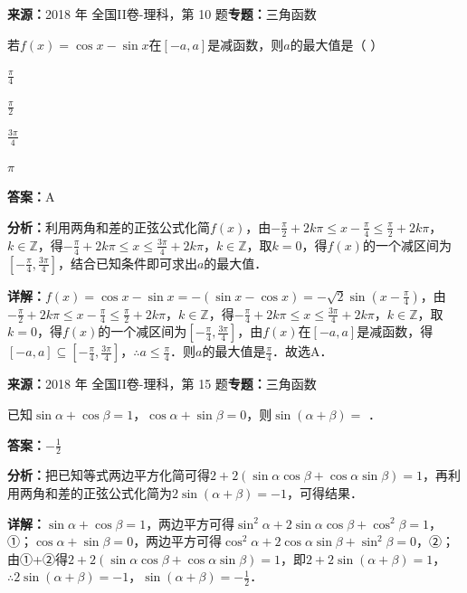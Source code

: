 \begin{question}[points=5]
\textbf{来源：}2018 年 全国II卷-理科，第 10 题\quad \textbf{专题：}三角函数\par
若$f(x)=\cos x-\sin x$在$[-a,a]$是减函数，则$a$的最大值是（                                                 ）
\begin{choices}
  \item $\frac{\pi}{4}$
  \item $\frac{\pi}{2}$
  \item $\frac{3\pi}{4}$
  \item $\pi$
\end{choices}
\begin{solution}
\textbf{答案：}A

\textbf{分析：}利用两角和差的正弦公式化简$f(x)$，由$-\frac{\pi}{2}+2k\pi\le x-\frac{\pi}{4}\le \frac{\pi}{2}+2k\pi$，$k\in\mathbb{Z}$，得$-\frac{\pi}{4}+2k\pi\le x\le \frac{3\pi}{4}+2k\pi$，$k\in\mathbb{Z}$，取$k=0$，得$f(x)$的一个减区间为$[-\frac{\pi}{4},\frac{3\pi}{4}]$，结合已知条件即可求出$a$的最大值．

\textbf{详解：}$f(x)=\cos x-\sin x=-(\sin x-\cos x)=-\sqrt{2}\sin(x-\frac{\pi}{4})$，由$-\frac{\pi}{2}+2k\pi\le x-\frac{\pi}{4}\le \frac{\pi}{2}+2k\pi$，$k\in\mathbb{Z}$，得$-\frac{\pi}{4}+2k\pi\le x\le \frac{3\pi}{4}+2k\pi$，$k\in\mathbb{Z}$，取$k=0$，得$f(x)$的一个减区间为$[-\frac{\pi}{4},\frac{3\pi}{4}]$，由$f(x)$在$[-a,a]$是减函数，得$[-a,a]\subseteq[-\frac{\pi}{4},\frac{3\pi}{4}]$，$\therefore a\le\frac{\pi}{4}$．则$a$的最大值是$\frac{\pi}{4}$．故选A．
\end{solution}
\end{question}

\begin{question}[points=5]
\textbf{来源：}2018 年 全国II卷-理科，第 15 题\quad \textbf{专题：}三角函数\par
已知$\sin\alpha+\cos\beta=1$，$\cos\alpha+\sin\beta=0$，则$\sin(\alpha+\beta)=$        ．
\fillin[{$-\frac{1}{2}$}]
\begin{solution}
\textbf{答案：}$-\frac{1}{2}$

\textbf{分析：}把已知等式两边平方化简可得$2+2(\sin\alpha\cos\beta+\cos\alpha\sin\beta)=1$，再利用两角和差的正弦公式化简为$2\sin(\alpha+\beta)=-1$，可得结果．

\textbf{详解：}$\sin\alpha+\cos\beta=1$，两边平方可得$\sin^2\alpha+2\sin\alpha\cos\beta+\cos^2\beta=1$，①；$\cos\alpha+\sin\beta=0$，两边平方可得$\cos^2\alpha+2\cos\alpha\sin\beta+\sin^2\beta=0$，②；由①+②得$2+2(\sin\alpha\cos\beta+\cos\alpha\sin\beta)=1$，即$2+2\sin(\alpha+\beta)=1$，$\therefore 2\sin(\alpha+\beta)=-1$，$\sin(\alpha+\beta)=-\frac{1}{2}$．
\end{solution}
\end{question}

